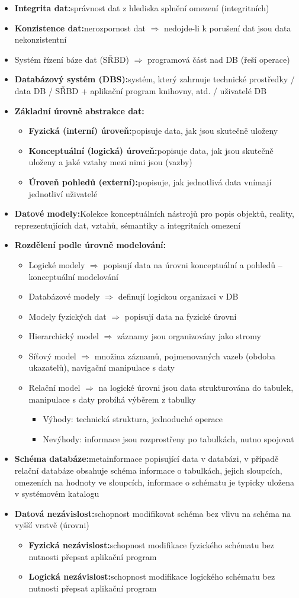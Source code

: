 \documentclass[a4paper,10pt]{article}
\newcommand{\pojem}[2]{\item \textbf{#1:}\quad #2}
\newcommand{\tedy}{$\Rightarrow$ }
\begin{document}
\begin{itemize}
			\pojem{Integrita dat}{správnost dat z hlediska splnění omezení (integritních)}
			\pojem{Konzistence dat}{nerozpornost dat \tedy nedojde-li k porušení dat jsou data nekonzistentní}
			\item Systém řízení báze dat (SŘBD) \tedy programová část nad DB (řeší operace)
			\pojem{Databázový systém (DBS)}{systém, který zahrnuje technické prostředky / data DB / SŘBD + aplikační program knihovny, atd. / uživatelé DB}
			\pojem{Základní úrovně abstrakce dat}
			\begin{itemize}
				\pojem{Fyzická (interní) úroveň}{popisuje data, jak jsou skutečně uloženy}
				\pojem{Konceptuální (logická) úroveň}{popisuje data, jak jsou skutečně uloženy a jaké vztahy mezi nimi jsou (vazby)}
				\pojem{Úroveň pohledů (externí)}{popisuje, jak jednotlivá data vnímají jednotliví uživatelé}
			\end{itemize}
			\pojem{Datové modely}{Kolekce konceptuálních nástrojů pro popis objektů, reality, reprezentujících dat, vztahů, sémantiky a integritních omezení}
			\pojem{Rozdělení podle úrovně modelování}
			\begin{itemize}
				\item Logické modely \tedy popisují data na úrovni konceptuální a pohledů -- konceptuální modelování
				\item Databázové modely \tedy definují logickou organizaci v DB
				\item Modely fyzických dat \tedy popisují data na fyzické úrovni
				\item Hierarchický model \tedy záznamy jsou organizovány jako stromy
				\item Síťový model \tedy množina záznamů, pojmenovaných vazeb (obdoba ukazatelů), navigační manipulace s daty
				\item Relační model \tedy na logické úrovni jsou data strukturována do tabulek, manipulace s daty probíhá výběrem z tabulky
				\begin{itemize}
					\item Výhody: technická struktura, jednoduché operace
					\item Nevýhody: informace jsou rozprostřeny po tabulkách, nutno spojovat
				\end{itemize}
			\end{itemize}

			\pojem{Schéma databáze}{metainformace popisující data v databázi, v případě relační databáze obsahuje schéma informace o tabulkách, jejich sloupcích, omezeních na hodnoty ve sloupcích, informace o schématu je typicky uložena v systémovém katalogu}
			\pojem{Datová nezávislost}{schopnost modifikovat schéma bez vlivu na schéma na vyšší vrstvě (úrovni)}
			\begin{itemize}
				\pojem{Fyzická nezávislost}{schopnost modifikace fyzického schématu bez nutnosti přepsat aplikační program}
				\pojem{Logická nezávislost}{schopnost modifikace logického schématu bez nutnosti přepsat aplikační program}
			\end{itemize}
		\end{itemize}
		
\end{document}
